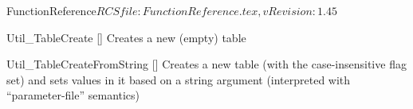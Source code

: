 \begin{cactuspart}{5}{FunctionReference}{$RCSfile: FunctionReference.tex,v $}{$Revision: 1.45 $}
\begin{Lentry}















\item[Util\_TableCreate]
     [\pageref{Util-TableCreate}]
Creates a new (empty) table

\item[Util\_TableCreateFromString]
     [\pageref{Util-TableCreateFromString}]
Creates a new table (with the case-insensitive flag set) and sets
values in it based on a string argument (interpreted with
``parameter-file'' semantics)


\end{Lentry}
\end{cactuspart}
